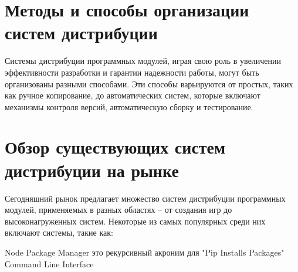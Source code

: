 \section{Методы и способы организации систем дистрибуции}

Системы дистрибуции программных модулей, играя свою роль в увеличении эффективности разработки и гарантии надежности работы, могут быть организованы разными способами. Эти способы варьируются от простых, таких как ручное копирование, до автоматических систем, которые включают механизмы контроля версий, автоматическую сборку и тестирование.

\section{Обзор существующих систем дистрибуции на рынке}

Сегодняшний рынок предлагает множество систем дистрибуции программных модулей, применяемых в разных областях – от создания игр до высоконагруженных систем. Некоторые из самых популярных среди них включают системы, такие как:



 {Node Package Manager}
 {это рекурсивный акроним для "Pip Installs Packages"}
 {Сommand Line Interface}

